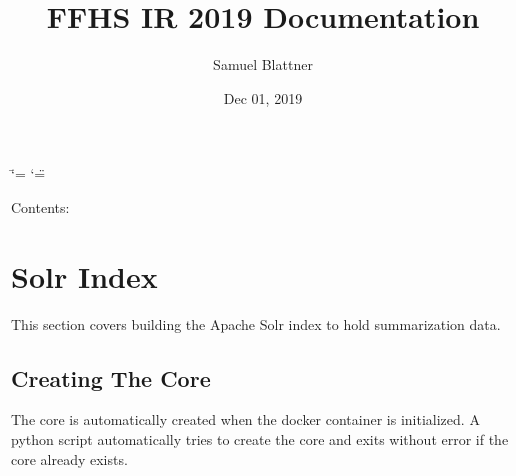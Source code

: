 \documentclass[letterpaper,10pt,english]{sphinxhowto}
\title{FFHS IR 2019 Documentation}
\date{Dec 01, 2019}
\author{Samuel Blattner}
\begin{document}
\ifdefined\shorthandoff
  \ifnum\catcode`\=\string=\active\shorthandoff{=}\fi
  \ifnum\catcode`\"=\active{}\fi
\fi

\pagestyle{empty}
\sphinxmaketitle
\pagestyle{plain}
\sphinxtableofcontents
\pagestyle{normal}
\label{\detokenize{index::doc}}


Contents:


\section{Solr Index}
\label{\detokenize{content/solr_index:solr-index}}\label{\detokenize{content/solr_index::doc}}
This section covers building the Apache Solr index to hold summarization data.


\subsection{Creating The Core}
\label{\detokenize{content/solr_index:creating-the-core}}
The core is automatically created when the docker container is initialized.
A python script  automatically tries to create the core and exits without error if the core already exists.
\end{document}
